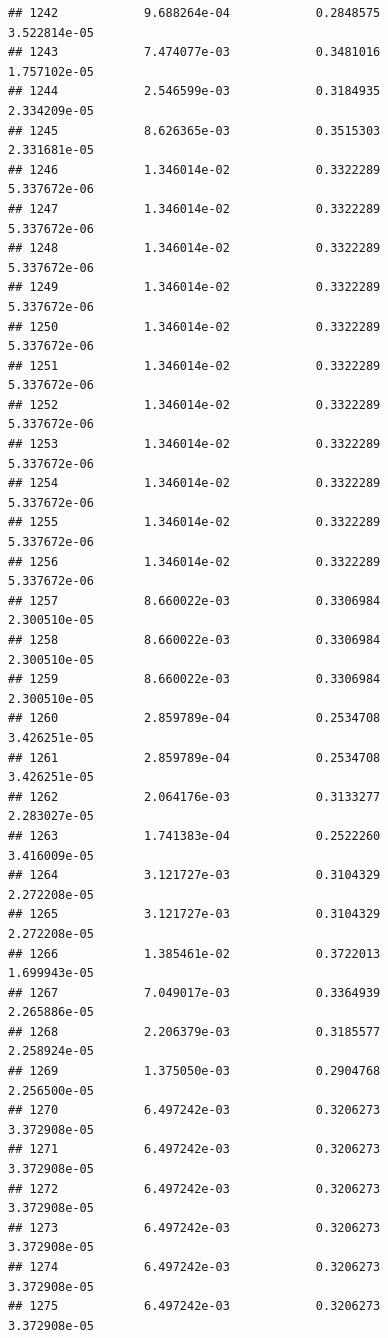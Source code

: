 \documentclass[
]{article}
\begin{document}
\begin{verbatim}
## 1242            9.688264e-04            0.2848575            3.522814e-05
## 1243            7.474077e-03            0.3481016            1.757102e-05
## 1244            2.546599e-03            0.3184935            2.334209e-05
## 1245            8.626365e-03            0.3515303            2.331681e-05
## 1246            1.346014e-02            0.3322289            5.337672e-06
## 1247            1.346014e-02            0.3322289            5.337672e-06
## 1248            1.346014e-02            0.3322289            5.337672e-06
## 1249            1.346014e-02            0.3322289            5.337672e-06
## 1250            1.346014e-02            0.3322289            5.337672e-06
## 1251            1.346014e-02            0.3322289            5.337672e-06
## 1252            1.346014e-02            0.3322289            5.337672e-06
## 1253            1.346014e-02            0.3322289            5.337672e-06
## 1254            1.346014e-02            0.3322289            5.337672e-06
## 1255            1.346014e-02            0.3322289            5.337672e-06
## 1256            1.346014e-02            0.3322289            5.337672e-06
## 1257            8.660022e-03            0.3306984            2.300510e-05
## 1258            8.660022e-03            0.3306984            2.300510e-05
## 1259            8.660022e-03            0.3306984            2.300510e-05
## 1260            2.859789e-04            0.2534708            3.426251e-05
## 1261            2.859789e-04            0.2534708            3.426251e-05
## 1262            2.064176e-03            0.3133277            2.283027e-05
## 1263            1.741383e-04            0.2522260            3.416009e-05
## 1264            3.121727e-03            0.3104329            2.272208e-05
## 1265            3.121727e-03            0.3104329            2.272208e-05
## 1266            1.385461e-02            0.3722013            1.699943e-05
## 1267            7.049017e-03            0.3364939            2.265886e-05
## 1268            2.206379e-03            0.3185577            2.258924e-05
## 1269            1.375050e-03            0.2904768            2.256500e-05
## 1270            6.497242e-03            0.3206273            3.372908e-05
## 1271            6.497242e-03            0.3206273            3.372908e-05
## 1272            6.497242e-03            0.3206273            3.372908e-05
## 1273            6.497242e-03            0.3206273            3.372908e-05
## 1274            6.497242e-03            0.3206273            3.372908e-05
## 1275            6.497242e-03            0.3206273            3.372908e-05

\end{verbatim}
\end{document}

